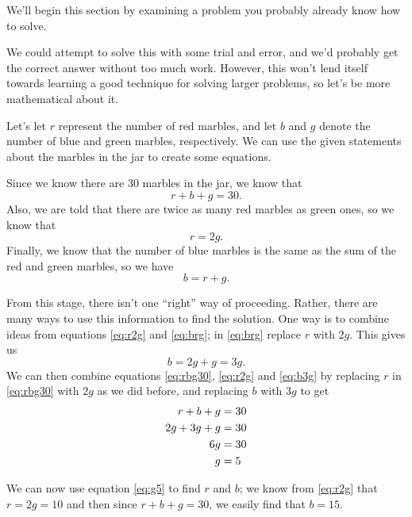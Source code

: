 We'll begin this section by examining a problem you probably already know how to solve.

\medskip

{We could attempt to solve this with some trial and error, and we'd probably get the correct answer without too much work. However, this won't lend itself towards learning a good technique for solving larger problems, so let's be more mathematical about it.

Let's let $r$ represent the number of red marbles, and let $b$ and $g$ denote the number of blue and green marbles, respectively. We can use the given statements about the marbles in the jar to create some equations. 

Since we know there are 30 marbles in the jar, we know that \begin{equation}\label{eq:rbg30}r+b+g=30. \end{equation} Also, we are told that there are twice as many red marbles as green ones, so we know that \begin{equation}\label{eq:r2g}r=2g.\end{equation} Finally, we know that the number of blue marbles is the same as the sum of the red and green marbles, so we have \begin{equation}\label{eq:brg}b = r+g.\end{equation}

From this stage, there isn't one ``right'' way of proceeding. Rather, there are many ways to use this information to find the solution. One way is to combine ideas from equations \ref{eq:r2g} and \ref{eq:brg}; in \ref{eq:brg} replace $r$ with $2g$. This gives us \begin{equation}\label{eq:b3g} b = 2g+g = 3g.\end{equation} We can then combine equations \ref{eq:rbg30}, \ref{eq:r2g} and \ref{eq:b3g} by replacing $r$ in \ref{eq:rbg30} with $2g$ as we did before, and replacing $b$ with $3g$ to get \begin{align} r+b+g &= 30 \notag\\  2g + 3g+g &=30 \notag \\ 6g&=30 \notag \\  g&=5 \label{eq:g5}\end{align}

We can now use equation \ref{eq:g5} to find $r$ and $b$; we know from \ref{eq:r2g} that $r = 2g = 10$ and then since $r+b+g = 30$, we easily find that $b = 15$. }

